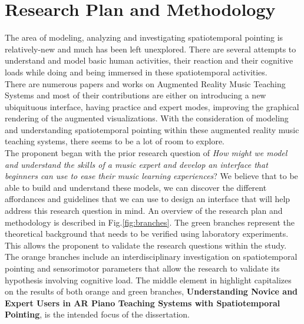 \documentclass{article}
\begin{document}
\section{Research Plan and Methodology}
The area of modeling, analyzing and investigating spatiotemporal pointing is relatively-new and much has been left unexplored. There are several attempts to understand and model basic human activities, their reaction and their cognitive loads while doing and being immersed in these spatiotemporal activities.\\

There are numerous papers and works on Augmented Reality Music Teaching Systems and most of their contributions are either on introducing a new ubiquituous interface, having practice and expert modes, improving the graphical rendering of the augmented visualizations. With the consideration of modeling and understanding spatiotemporal pointing within these augmented reality music teaching systems, there seems to be a lot of room to explore.\\

The proponent began with the prior research question of \textit{How might we model and understand the skills of a music expert and develop an interface that beginners can use to ease their music learning experiences}? We believe that to be able to build and understand these models, we can discover the different affordances and guidelines that we can use to design an interface that will help address this research question in mind. An overview of the research plan and methodology is described in Fig.\ref{fig:branches}. The green branches represent the theoretical background that needs to be verified using laboratory experiments. This allows the proponent to validate the research questions within the study.  The orange branches include an interdisciplinary investigation on spatiotemporal pointing and sensorimotor parameters that allow the research to validate its hypothesis involving cognitive load. The middle element in highlight capitalizes on the results of both orange and green branches, \textbf{Understanding Novice and Expert Users in AR Piano Teaching Systems with Spatiotemporal Pointing}, is the intended focus of the dissertation. 
\end{document}
